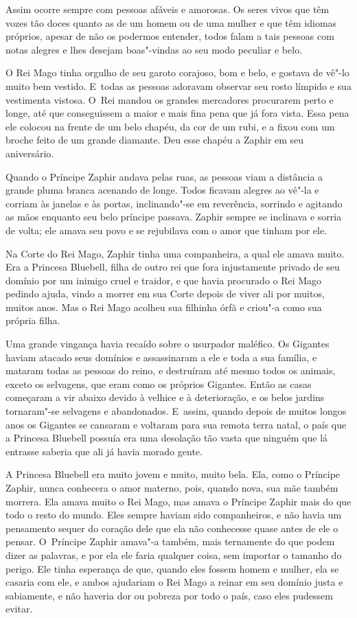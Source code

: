 Assim ocorre sempre com pessoas afáveis e amorosas. Os seres vivos que
têm vozes tão doces quanto as de um homem ou de uma mulher e que têm
idiomas próprios, apesar de não os podermos entender, todos falam a tais
pessoas com notas alegres e lhes desejam boas"-vindas ao seu modo
peculiar e belo.

O Rei Mago tinha orgulho de seu garoto corajoso, bom e belo, e gostava
de vê"-lo muito bem vestido. E~todas as pessoas adoravam observar seu
rosto límpido e sua vestimenta vistosa. O~Rei mandou os grandes
mercadores procurarem perto e longe, até que conseguissem a maior e mais
fina pena que já fora vista. Essa pena ele colocou na frente de um belo
chapéu, da cor de um rubi, e a fixou com um broche feito de um grande
diamante. Deu esse chapéu a Zaphir em seu aniversário.

Quando o Príncipe Zaphir andava pelas ruas, as pessoas viam a distância
a grande pluma branca acenando de longe. Todos ficavam alegres ao vê"-la
e corriam às janelas e às portas, inclinando"-se em reverência, sorrindo
e agitando as mãos enquanto seu belo príncipe passava. Zaphir sempre se
inclinava e sorria de volta; ele amava seu povo e se rejubilava com o
amor que tinham por ele.

Na Corte do Rei Mago, Zaphir tinha uma companheira, a qual ele amava
muito. Era a Princesa Bluebell, filha de outro rei que fora injustamente
privado de seu domínio por um inimigo cruel e traidor, e que havia
procurado o Rei Mago pedindo ajuda, vindo a morrer em sua Corte depois
de viver ali por muitos, muitos anos. Mas o Rei Mago acolheu sua
filhinha órfã e criou"-a como sua própria filha.

Uma grande vingança havia recaído sobre o usurpador maléfico. Os
Gigantes haviam atacado seus domínios e assassinaram a ele e toda a sua
família, e mataram todas as pessoas do reino, e destruíram até mesmo
todos os animais, exceto os selvagens, que eram como os próprios
Gigantes. Então as casas começaram a vir abaixo devido à velhice e à
deterioração, e os belos jardins tornaram"-se selvagens e abandonados. E~assim, quando depois de muitos longos anos os Gigantes se cansaram e
voltaram para sua remota terra natal, o país que a Princesa Bluebell
possuía era uma desolação tão vasta que ninguém que lá entrasse saberia
que ali já havia morado gente.

A Princesa Bluebell era muito jovem e muito, muito bela. Ela, como o
Príncipe Zaphir, nunca conhecera o amor materno, pois, quando nova, sua
mãe também morrera. Ela amava muito o Rei Mago, mas amava o Príncipe
Zaphir mais do que todo o resto do mundo. Eles sempre haviam sido
companheiros, e não havia um pensamento sequer do coração dele que ela
não conhecesse quase antes de ele o pensar. O~Príncipe Zaphir amava"-a
também, mais ternamente do que podem dizer as palavras, e por ela ele
faria qualquer coisa, sem importar o tamanho do perigo. Ele tinha
esperança de que, quando eles fossem homem e mulher, ela se casaria com
ele, e ambos ajudariam o Rei Mago a reinar em seu domínio justa e
sabiamente, e não haveria dor ou pobreza por todo o país, caso eles
pudessem evitar.

